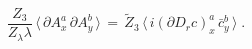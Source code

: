 \begin{equation}
  \label{ghDSEs1}
   \frac{Z_3}{Z_\lambda \lambda} \,  \langle \,
      \partial A^a_x \, \partial A^b_y \, \rangle \, = \,   
      \widetilde Z_3 \,  \langle  \, i (\partial D_r c)^a_x \, \bar c^b_y\,
  \rangle  \;.
\end{equation}

